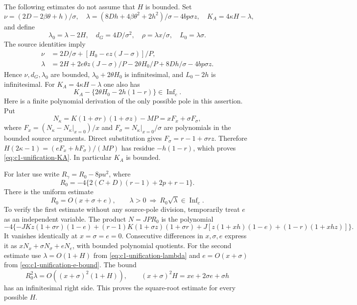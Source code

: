 \documentclass[10pt,a4paper]{article}
\begin{document}
The following estimates do not assume that $H$ is bounded. Set
\[
 \nu=(2D-2\beta\theta+h)/\sigma,\quad
 \lambda=(8Dh+4\beta\theta^2+2h^2)/\sigma-4bp\sigma z,\quad
 K_A=4\kappa H-\lambda,
\]
and define
\[
 \lambda_0=\lambda-2H,\quad d_G=4D/\sigma^2,\quad
 \rho=\lambda x/\sigma,\quad L_0=\lambda\sigma.
\]
The source identities imply
\begin{align}
 \nu&=2D/\sigma+[H_0-ez(J-\sigma)]/P,\label{eq:c1-unification-nu}\\
 \lambda&=2H+2e\theta z(J-\sigma)/P
            -2\theta H_0/P+8Dh/\sigma-4bp\sigma z.
            \label{eq:c1-unification-lambda}
\end{align}
Hence $\nu,d_G,\lambda_0$ are bounded,
$\lambda_0+2\theta H_0$ is infinitesimal, and $L_0-2h$ is infinitesimal.
For $K_A=4\kappa H-\lambda$ one also has
\begin{equation}\label{eq:c1-unification-KA}
 K_A-\{2\theta H_0-2h(1-r)\}\in\operatorname{Inf}_c.
\end{equation}
Here is a finite polynomial derivation of the only possible pole in
this assertion. Put
\[
 N_\kappa=K(1+\sigma r)(1+\sigma z)-MP
          =xF_x+\sigma F_\sigma,
\]
where $F_x=(N_\kappa-N_\kappa|_{x=0})/x$ and
$F_\sigma=N_\kappa|_{x=0}/\sigma$ are polynomials in the bounded
source arguments. Direct substitution gives
$F_\sigma=r-1+\sigma rz$. Therefore
$H(2\kappa-1)=(eF_x+hF_\sigma)/(MP)$ has residue $-h(1-r)$,
which proves \eqref{eq:c1-unification-KA}. In particular $K_A$ is bounded.

For later use write $R_\gamma=R_0-8pu^2$, where
\[
 R_0=-4\{2(C+D)(r-1)+2p+r-1\}.
\]
There is the uniform estimate
\begin{equation}\label{eq:c1-unification-R0}
 R_0=O(x+\sigma+e),\qquad
 \lambda>0\ \Longrightarrow\ R_0\sqrt\lambda\in\operatorname{Inf}_c.
\end{equation}
To verify the first estimate without any source-pole division, temporarily
treat $e$ as an independent variable. The product $N=JPR_0$ is the
polynomial
\[
 -4\{-JKz(1+\sigma r)(1-e)
 +(r-1)K(1+\sigma z)(1+\sigma r)
 +J[z(1+xh)(1-e)+(1-r)(1+xhz)]\}.
\]
It vanishes identically at $x=\sigma=e=0$. Consecutive differences
in $x,\sigma,e$ express it as $xN_x+\sigma N_\sigma+eN_e$, with
bounded polynomial quotients. For the second estimate use
$\lambda=O(1+H)$ from \eqref{eq:c1-unification-lambda} and
$e=O(x+\sigma)$ from \eqref{eq:c1-unification-e-bound}. The bound
\[
 R_0^2\lambda=O((x+\sigma)^2(1+H)),\qquad
 (x+\sigma)^2H=xe+2\sigma e+\sigma h
\]
has an infinitesimal right side. This proves the square-root estimate
for every possible $H$.
\end{document}
